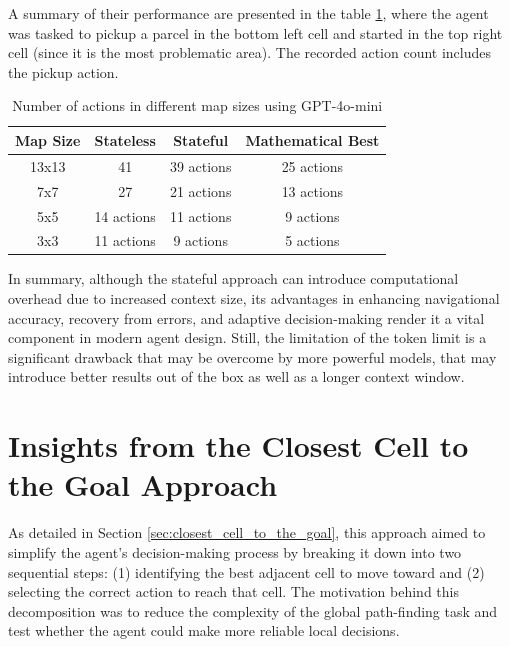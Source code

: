 A summary of their performance are presented in the table \ref{tab:svss}, where the
agent was tasked to pickup a parcel in the bottom left cell and started in the top
right cell (since it is the most problematic area). The recorded action count
includes the pickup action.

\vspace{5mm}
\begin{table}[h]
  \centering
  \begin{tabular}{c|cc|c}
    \textbf{Map Size} & \textbf{Stateless} & \textbf{Stateful} & \textbf{Mathematical Best} \\
    \hline
    13x13             & 41                 & 39 actions        & 25 actions                 \\
    7x7               & 27                 & 21 actions        & 13 actions                 \\
    5x5               & 14 actions         & 11 actions        & 9 actions                  \\
    3x3               & 11 actions         & 9 actions         & 5 actions                  \\
  \end{tabular}
  \caption{Number of actions in different map sizes using GPT-4o-mini}
  \label{tab:svss}
\end{table}
\vspace{5mm}

In summary, although the stateful approach can introduce computational overhead
due to increased context size, its advantages in enhancing navigational accuracy,
recovery from errors, and adaptive decision-making render it a vital component in
modern agent design. Still, the limitation of the token limit is a significant drawback
that may be overcome by more powerful models, that may introduce better results
out of the box as well as a longer context window.

\section{Insights from the Closest Cell to the Goal Approach}
\label{sec:closest_cell_to_the_goal_results}

As detailed in Section \ref{sec:closest_cell_to_the_goal}, this approach aimed
to simplify the agent's decision-making process by breaking it down into two
sequential steps: (1) identifying the best adjacent cell to move toward and (2) selecting
the correct action to reach that cell. The motivation behind this decomposition
was to reduce the complexity of the global path-finding task and test whether
the agent could make more reliable local decisions.

